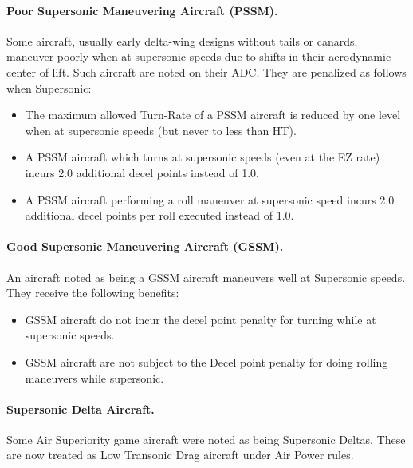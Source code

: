 
\paragraph{Poor Supersonic Maneuvering Aircraft (PSSM).} Some aircraft, usually early delta-wing designs without tails or canards, maneuver poorly when at supersonic speeds due to shifts in their aerodynamic center of lift.  Such aircraft are noted on their ADC. They are penalized as follows when Supersonic:

\begin{itemize}

    \item The maximum allowed Turn-Rate of a PSSM aircraft is reduced by one level when at supersonic speeds (but never to less than HT).

    \item A PSSM aircraft which turns at supersonic speeds (even at the EZ rate) incurs 2.0 additional decel points instead of 1.0.

    \item A PSSM aircraft performing a roll maneuver at supersonic speed incurs 2.0 additional decel points per roll executed instead of 1.0.

\end{itemize}

\paragraph{Good Supersonic Maneuvering Aircraft (GSSM).} An aircraft noted as being a GSSM aircraft maneuvers well at Supersonic speeds. They receive the following benefits:

\begin{itemize}

    \item GSSM aircraft do not incur the decel point penalty for turning while at supersonic speeds.

    \item GSSM aircraft are not subject to the Decel point penalty for doing rolling maneuvers while supersonic.

\end{itemize}

\paragraph{Supersonic Delta Aircraft.} Some Air Superiority game aircraft were noted as being Supersonic Deltas. These are now treated as Low Transonic Drag aircraft under Air Power rules.

